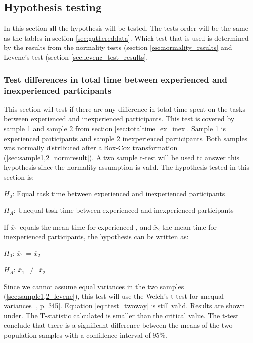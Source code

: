 \vspace{0.5cm}

\subsection{Hypothesis testing}\label{sec:hypothesis_results}
In this section all the hypothesis will be tested. The tests order will be the same as the tables in section \ref{sec:gathereddata}. Which test that is used is determined by the results from the normality tests (section \ref{sec:normality_results} and Levene's test (section \ref{sec:levene_test_results}.

\subsubsection[Sample 1, 2]{Test differences in total time between experienced and inexperienced participants}\label{sec:t-test_result} 
This section will test if there are any difference in total time spent on the tasks between experienced and inexperienced participants. This test is covered by sample 1 and sample 2 from section \ref{sec:totaltime_ex_inex}. Sample 1 is experienced participants and sample 2 inexperienced participants. Both samples was normally distributed after a Box-Cox transformation (\ref{sec:sample1,2_normresult}). A two sample t-test will be used to answer this hypothesis since the normality assumption is valid. The hypothesis tested in this section is: \\[0.3cm]

\centerline{$H_{0}$: Equal task time between experienced and inexperienced participants} 
\centerline{$H_{A}$: Unequal task time between experienced and inexperienced participants}

\vspace{0.3cm}

If $\overline{x}_1$ equals the mean time for experienced-, and $\overline{x}_2$ the mean time for inexperienced participants, the hypothesis can be written as:\\[0.3cm]

\centerline{$H_{0}$: $\overline{x}_1$ = $\overline{x}_2$} 
\centerline{$H_{A}$: $\overline{x}_1$ $\neq$ $\overline{x}_2$}

\vspace{0.3cm}

Since we cannot assume equal variances in the two samples (\ref{sec:sample1,2_levene}), this test will use the Welch's t-test for unequal variances [\citep{Walpole2012}, p. 345]. Equation \ref{eq:ttest_twoway} is still valid. Results are shown under. The T-statistic calculated is smaller than the critical value. The t-test conclude that there is a significant difference between the means of the two population samples with a confidence interval of 95\%.\\[0.2cm]

